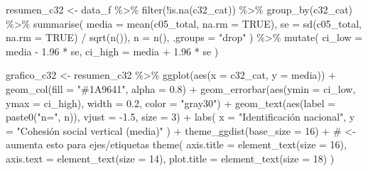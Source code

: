 \documentclass[
  spanish,
  a4paper,
  oneside]{scrbook}
\newenvironment{Shaded}{\begin{snugshade}}{\end{snugshade}}
\newcommand{\AttributeTok}[1]{\textcolor[rgb]{0.40,0.45,0.13}{#1}}
\newcommand{\CommentTok}[1]{\textcolor[rgb]{0.37,0.37,0.37}{#1}}
\newcommand{\ConstantTok}[1]{\textcolor[rgb]{0.56,0.35,0.01}{#1}}
\newcommand{\DecValTok}[1]{\textcolor[rgb]{0.68,0.00,0.00}{#1}}
\newcommand{\FloatTok}[1]{\textcolor[rgb]{0.68,0.00,0.00}{#1}}
\newcommand{\FunctionTok}[1]{\textcolor[rgb]{0.28,0.35,0.67}{#1}}
\newcommand{\NormalTok}[1]{\textcolor[rgb]{0.00,0.23,0.31}{#1}}
\newcommand{\OtherTok}[1]{\textcolor[rgb]{0.00,0.23,0.31}{#1}}
\newcommand{\SpecialCharTok}[1]{\textcolor[rgb]{0.37,0.37,0.37}{#1}}
\newcommand{\StringTok}[1]{\textcolor[rgb]{0.13,0.47,0.30}{#1}}
\begin{document}
\begin{Shaded}
\begin{Highlighting}[]
\NormalTok{resumen\_c32 }\OtherTok{\textless{}{-}}\NormalTok{ data\_f }\SpecialCharTok{\%\textgreater{}\%}
  \FunctionTok{filter}\NormalTok{(}\SpecialCharTok{!}\FunctionTok{is.na}\NormalTok{(c32\_cat)) }\SpecialCharTok{\%\textgreater{}\%}
  \FunctionTok{group\_by}\NormalTok{(c32\_cat) }\SpecialCharTok{\%\textgreater{}\%}
  \FunctionTok{summarise}\NormalTok{(}
    \AttributeTok{media   =} \FunctionTok{mean}\NormalTok{(c05\_total, }\AttributeTok{na.rm =} \ConstantTok{TRUE}\NormalTok{),}
    \AttributeTok{se      =} \FunctionTok{sd}\NormalTok{(c05\_total, }\AttributeTok{na.rm =} \ConstantTok{TRUE}\NormalTok{) }\SpecialCharTok{/} \FunctionTok{sqrt}\NormalTok{(}\FunctionTok{n}\NormalTok{()),}
    \AttributeTok{n       =} \FunctionTok{n}\NormalTok{(),}
    \AttributeTok{.groups =} \StringTok{"drop"}
\NormalTok{  ) }\SpecialCharTok{\%\textgreater{}\%}
  \FunctionTok{mutate}\NormalTok{(}
    \AttributeTok{ci\_low  =}\NormalTok{ media }\SpecialCharTok{{-}} \FloatTok{1.96} \SpecialCharTok{*}\NormalTok{ se,}
    \AttributeTok{ci\_high =}\NormalTok{ media }\SpecialCharTok{+} \FloatTok{1.96} \SpecialCharTok{*}\NormalTok{ se}
\NormalTok{  )}

\NormalTok{grafico\_c32 }\OtherTok{\textless{}{-}}\NormalTok{ resumen\_c32 }\SpecialCharTok{\%\textgreater{}\%}
  \FunctionTok{ggplot}\NormalTok{(}\FunctionTok{aes}\NormalTok{(}\AttributeTok{x =}\NormalTok{ c32\_cat, }\AttributeTok{y =}\NormalTok{ media)) }\SpecialCharTok{+}
  \FunctionTok{geom\_col}\NormalTok{(}\AttributeTok{fill =} \StringTok{"\#1A9641"}\NormalTok{, }\AttributeTok{alpha =} \FloatTok{0.8}\NormalTok{) }\SpecialCharTok{+}
  \FunctionTok{geom\_errorbar}\NormalTok{(}\FunctionTok{aes}\NormalTok{(}\AttributeTok{ymin =}\NormalTok{ ci\_low, }\AttributeTok{ymax =}\NormalTok{ ci\_high),}
                \AttributeTok{width =} \FloatTok{0.2}\NormalTok{, }\AttributeTok{color =} \StringTok{"gray30"}\NormalTok{) }\SpecialCharTok{+}
  \FunctionTok{geom\_text}\NormalTok{(}\FunctionTok{aes}\NormalTok{(}\AttributeTok{label =} \FunctionTok{paste0}\NormalTok{(}\StringTok{"n="}\NormalTok{, n)), }\AttributeTok{vjust =} \SpecialCharTok{{-}}\FloatTok{1.5}\NormalTok{, }\AttributeTok{size =} \DecValTok{3}\NormalTok{) }\SpecialCharTok{+}
  \FunctionTok{labs}\NormalTok{(}
    \AttributeTok{x =} \StringTok{"Identificación nacional"}\NormalTok{,}
    \AttributeTok{y =} \StringTok{"Cohesión social vertical (media)"}
\NormalTok{  ) }\SpecialCharTok{+}
  \FunctionTok{theme\_ggdist}\NormalTok{(}\AttributeTok{base\_size =} \DecValTok{16}\NormalTok{) }\SpecialCharTok{+}                                     \CommentTok{\# \textless{}{-} aumenta esto para ejes/etiquetas}
  \FunctionTok{theme}\NormalTok{(}
    \AttributeTok{axis.title =} \FunctionTok{element\_text}\NormalTok{(}\AttributeTok{size =} \DecValTok{16}\NormalTok{),}
    \AttributeTok{axis.text  =} \FunctionTok{element\_text}\NormalTok{(}\AttributeTok{size =} \DecValTok{14}\NormalTok{),}
    \AttributeTok{plot.title =} \FunctionTok{element\_text}\NormalTok{(}\AttributeTok{size =} \DecValTok{18}\NormalTok{)}
\NormalTok{  )}



\end{Highlighting}
\end{Shaded}
\end{document}
